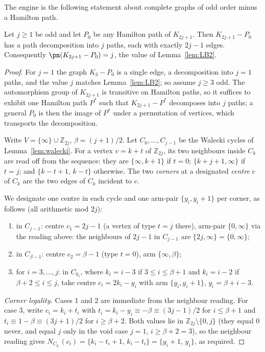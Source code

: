 The engine is the following statement about complete graphs of odd order minus a Hamilton path.

\begin{theorem}\label{thm:L0}
Let $j\ge1$ be odd and let $P_0$ be any Hamilton path of $K_{2j+1}$. Then $K_{2j+1}-P_0$ has a
path decomposition into $j$ paths, each with exactly $2j-1$ edges. Consequently
$\pn(K_{2j+1}-P_0)=j$, the value of Lemma~\ref{lem:LB2}.
\end{theorem}

\begin{proof}
For $j=1$ the graph $K_3-P_0$ is a single edge, a decomposition into $j=1$ paths, and the
value $j$ matches Lemma~\ref{lem:LB2}; so assume $j\ge3$ odd. The automorphism group of
$K_{2j+1}$ is transitive on Hamilton paths, so it suffices to
exhibit one Hamilton path $P^*$ such that $K_{2j+1}-P^*$ decomposes into $j$ paths; a general
$P_0$ is then the image of $P^*$ under a permutation of vertices, which transports the
decomposition.

Write $V=\{\infty\}\cup\mathbb{Z}_{2j}$, $\beta=(j+1)/2$. Let $C_0,\dots,C_{j-1}$ be the
Walecki cycles of Lemma~\ref{lem:walecki}. For a vertex $v=k+t$ of $\mathbb{Z}_{2j}$, its two
neighbours inside $C_k$ are read off from the sequence: they are $\{\infty,k+1\}$ if $t=0$;
$\{k+j+1,\infty\}$ if $t=j$; and $\{k-t+1,\,k-t\}$ otherwise. The two \emph{corners} at a
designated \emph{centre} $c$ of $C_k$ are the two edges of $C_k$ incident to $c$.

We designate one centre in each cycle and one arm-pair $\{y_i,y_i+1\}$ per corner, as follows
(all arithmetic mod $2j$):
\begin{enumerate}[label=\arabic*.,leftmargin=2em]
\item in $C_{j-1}$: centre $c_1=2j-1$ (a vertex of type $t=j$ there), arm-pair
$\{0,\infty\}$ via the reading above: the neighbours of $2j-1$ in $C_{j-1}$ are
$\{2j,\infty\}=\{0,\infty\}$;
\item in $C_{\beta-1}$: centre $c_2=\beta-1$ (type $t=0$), arm $\{\infty,\beta\}$;
\item for $i=3,\dots,j$: in $C_{k_i}$, where $k_i=i-3$ if $3\le i\le\beta+1$ and $k_i=i-2$ if
$\beta+2\le i\le j$, take centre $c_i=2k_i-y_i$ with arm $\{y_i,y_i+1\}$,
$y_i=\beta+i-3$.
\end{enumerate}
\emph{Corner legality.} Cases 1 and 2 are immediate from the neighbour reading. For case 3,
write $c_i=k_i+t_i$ with $t_i=k_i-y_i\equiv-\beta\equiv(3j-1)/2$ for $i\le\beta+1$ and
$t_i\equiv 1-\beta\equiv(3j+1)/2$ for $i\ge\beta+2$. Both values lie in
$\mathbb{Z}_{2j}\setminus\{0,j\}$ (they equal $0$ never, and equal $j$ only in the void case
$j=1$, $i\ge\beta+2=3$), so the neighbour reading gives
$N_{C_{k_i}}(c_i)=\{k_i-t_i+1,\,k_i-t_i\}=\{y_i+1,\,y_i\}$, as required.


\end{proof}
